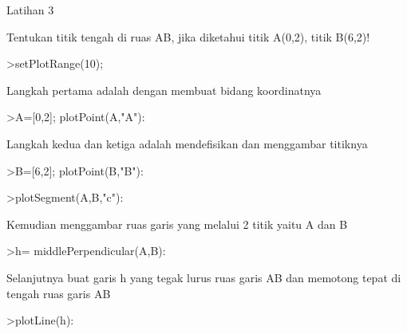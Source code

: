 \documentclass[a4paper,10pt]{article}
\begin{document}
\begin{eulernotebook}
\begin{eulercomment}
\begin{eulercomment}
\begin{eulercomment}
Latihan 3\\
\end{eulercomment}
\eulersubheading{}
\begin{eulercomment}
Tentukan titik tengah di ruas AB, jika diketahui titik A(0,2), titik
B(6,2)!
\end{eulercomment}
\begin{eulerprompt}
>setPlotRange(10);
\end{eulerprompt}
\begin{eulercomment}
Langkah pertama adalah dengan membuat bidang koordinatnya
\end{eulercomment}
\begin{eulerprompt}
>A=[0,2]; plotPoint(A,"A"):
\end{eulerprompt}
\begin{eulercomment}
Langkah kedua dan ketiga adalah mendefisikan dan menggambar titiknya
\end{eulercomment}
\begin{eulerprompt}
>B=[6,2]; plotPoint(B,"B"):
\end{eulerprompt}
\begin{eulerprompt}
>plotSegment(A,B,"c"):
\end{eulerprompt}
\begin{eulercomment}
Kemudian menggambar ruas garis yang melalui 2 titik yaitu A dan B 
\end{eulercomment}
\begin{eulerprompt}
>h= middlePerpendicular(A,B):
\end{eulerprompt}
\begin{eulercomment}
Selanjutnya buat garis h yang tegak lurus ruas garis AB dan memotong
tepat di tengah ruas garis AB
\end{eulercomment}
\begin{eulerprompt}
>plotLine(h):
\end{eulerprompt}
\begin{eulercomment}

\end{eulercomment}
\end{eulercomment}
\end{eulercomment}
\end{eulernotebook}
\end{document}

